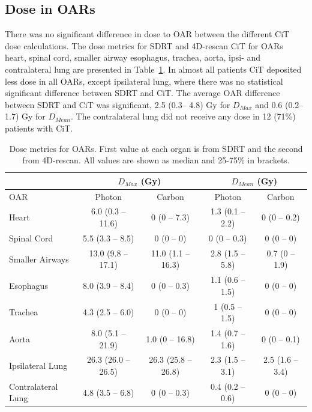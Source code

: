 \documentclass[type=dr, dr=rernat, acm$^3$entcolor=tud7b,colorbacktitle, bigchapter, openright, twoside, 12pt ]{tudthesis}
\begin{document}
\subsection{Dose in OARs}

There was no significant difference in dose to OAR between the different CiT dose calculations. The dose metrics for SDRT and 4D-rescan CiT for 
OARs heart, spinal cord, smaller airway esophagus, trachea, aorta, ipsi- and contralateral lung are presented in Table~\ref{tab:results}. 
In almost all patients CiT deposited less dose in all OARs, except ipsilateral lung, where there was no statistical significant difference between SDRT and CiT. 
The average OAR difference between SDRT and CiT was significant, 2.5 (0.3– 4.8) Gy for $D_{Max}$ and 0.6 (0.2– 1.7) Gy for $D_{Mean}$. 
The contralateral lung did not receive any dose in 12 (71\%) patients with CiT.

\begin{table}[H]
  \centering
  \caption{Dose metrics for OARs. First value at each organ is from SDRT and the second from 4D-rescan. All values are shown as median and 25-75\% in brackets.}
  \begin{tabular}{l|c|c|c|c|}
    \cline{2-5}
     & \multicolumn{2}{|c|}{$D_{Max}$ (Gy)} & \multicolumn{2}{|c|}{$D_{Mean}$ (Gy)} \\
     \hline
    \multicolumn{1}{|l|}{OAR} & Photon & Carbon & Photon & Carbon	\\
    \hline
\multicolumn{1}{|l|}{Heart} & 6.0 (0.3 – 11.6) & 0 (0 – 7.3) & 1.3 (0.1 – 2.2) & 0 (0 – 0.2)	\\
\multicolumn{1}{|l|}{Spinal Cord} & 5.5 (3.3 – 8.5) & 0 (0 – 0) & 0 (0 – 0.3) & 0 (0 – 0)	\\
\multicolumn{1}{|l|}{Smaller Airways} & 13.0 (9.8 – 17.1) & 11.0 (1.1 – 16.3) & 2.8 (1.5 – 5.8) & 0.7 (0 – 1.9)	\\
\multicolumn{1}{|l|}{Esophagus} & 8.0 (3.9 – 8.4) & 0 (0 – 0.3) & 1.1 (0.6 – 1.5) & 0 (0 – 0)	\\
\multicolumn{1}{|l|}{Trachea} & 4.3 (2.5 – 6.0) & 0 (0 – 0) & 1 (0.5 – 1.5) & 0 (0 – 0)	\\
\multicolumn{1}{|l|}{Aorta} & 8.0 (5.1 – 21.9) & 1.0 (0 – 16.8) & 1.4 (0.7 – 1.6) & 0 (0 – 0.1)	\\
\multicolumn{1}{|l|}{Ipsilateral Lung} & 26.3 (26.0 – 26.5) & 26.3 (25.8 – 26.8) & 2.3 (1.5 – 3.1) & 2.5 (1.6 – 3.4)	\\
\multicolumn{1}{|l|}{Contralateral Lung} & 4.8 (3.5 – 6.8) & 0 (0 – 0.3) & 0.4 (0.2 – 0.6) & 0 (0 – 0)	\\
    \hline\hline
  \end{tabular}
  \label{tab:results}
\end{table}
\end{document}

